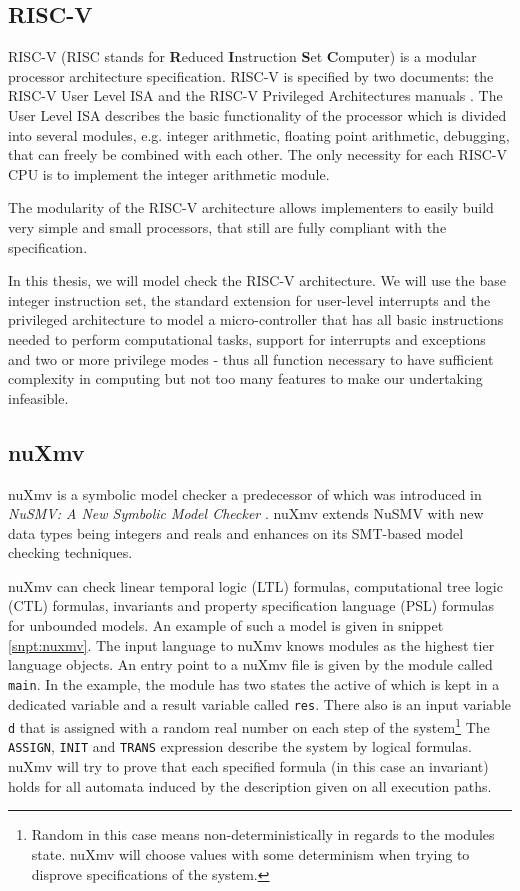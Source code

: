 \documentclass{securem}
\begin{document}
\subsection{RISC-V}

RISC-V (RISC stands for \textbf{R}educed \textbf{I}nstruction \textbf{S}et \textbf{C}omputer) is a modular processor architecture specification.
RISC-V is specified by two documents: the RISC-V User Level ISA \cite{RiscVISA} and the RISC-V Privileged Architectures manuals \cite{RiscVISAP}.
The User Level ISA describes the basic functionality of the processor which is divided into several modules, e.g. integer arithmetic, floating point arithmetic, debugging, that can freely be combined with each other.
The only necessity for each RISC-V CPU is to implement the integer arithmetic module.

The modularity of the RISC-V architecture allows implementers to easily build very simple and small processors, that still are fully compliant with the specification.

In this thesis, we will model check the RISC-V architecture.
We will use the base integer instruction set, the standard extension for user-level interrupts and the privileged architecture to model a micro-controller that has all basic instructions needed to perform computational tasks, support for interrupts and exceptions and two or more privilege modes - thus all function necessary to have sufficient complexity in computing but not too many features to make our undertaking infeasible.

\subsection{nuXmv}

nuXmv \cite{Cavada14} is a symbolic model checker a predecessor of which was introduced in \textit{NuSMV: A New Symbolic Model Checker} \cite{Cimatti2000}.
nuXmv extends NuSMV with new data types being integers and reals and enhances on its SMT-based model checking techniques.

nuXmv can check linear temporal logic (LTL) formulas, computational tree logic (CTL) formulas, invariants and property specification language (PSL) formulas for unbounded models.
An example of such a model is given in snippet \ref{snpt:nuxmv}.
The input language to nuXmv knows modules as the highest tier language objects.
An entry point to a nuXmv file is given by the module called \texttt{main}.
In the example, the module has two states the active of which is kept in a dedicated variable and a result variable called \texttt{res}.
There also is an input variable \texttt{d} that is assigned with a random real number on each step of the system\footnote{%
    Random in this case means non-deterministically in regards to the modules state.
    nuXmv will choose values with some determinism when trying to disprove specifications of the system.
}
The \texttt{ASSIGN}, \texttt{INIT} and \texttt{TRANS} expression describe the system by logical formulas.
nuXmv will try to prove that each specified formula (in this case an invariant) holds for all automata induced by the description given on all execution paths.
\end{document}
